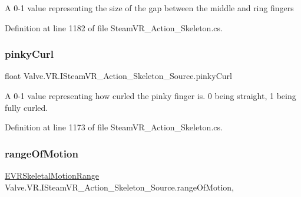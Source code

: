 A 0-\/1 value representing the size of the gap between the middle and ring fingers 



Definition at line 1182 of file Steam\+V\+R\+\_\+\+Action\+\_\+\+Skeleton.\+cs.

\mbox{\label{interface_valve_1_1_v_r_1_1_i_steam_v_r___action___skeleton___source_a87e1f1563f88552a6e9089020d43137b}} 
\subsubsection{\texorpdfstring{pinkyCurl}{pinkyCurl}}
{\footnotesize\ttfamily float Valve.\+V\+R.\+I\+Steam\+V\+R\+\_\+\+Action\+\_\+\+Skeleton\+\_\+\+Source.\+pinky\+Curl\hspace{0.3cm}{\ttfamily [get]}}



A 0-\/1 value representing how curled the pinky finger is. 0 being straight, 1 being fully curled. 



Definition at line 1173 of file Steam\+V\+R\+\_\+\+Action\+\_\+\+Skeleton.\+cs.

\mbox{\label{interface_valve_1_1_v_r_1_1_i_steam_v_r___action___skeleton___source_ade889c5dd86319d30851f4f7cc85d742}} 
\subsubsection{\texorpdfstring{rangeOfMotion}{rangeOfMotion}}
{\footnotesize\ttfamily \mbox{\hyperlink{namespace_valve_1_1_v_r_affc8d18345f8f5d36f1ae7b4ce534500}{E\+V\+R\+Skeletal\+Motion\+Range}} Valve.\+V\+R.\+I\+Steam\+V\+R\+\_\+\+Action\+\_\+\+Skeleton\+\_\+\+Source.\+range\+Of\+Motion\hspace{0.3cm}{\ttfamily [get]}, {\ttfamily [set]}}



